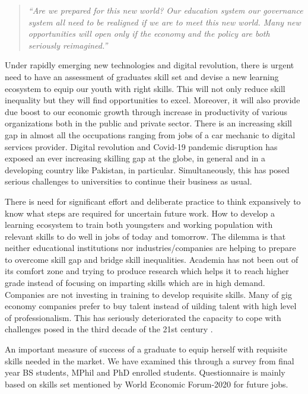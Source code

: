 \documentclass[
]{aft}
\begin{document}
\begin{quote}
\emph{``Are we prepared for this new world? Our education system our
governance system all need to be realigned if we are to meet this new
world. Many new opportunities will open only if the economy and the
policy are both seriously reimagined.''}
\end{quote}

Under rapidly emerging new technologies and digital revolution, there is
urgent need to have an assessment of graduates skill set and devise a
new learning ecosystem to equip our youth with right skills. This will
not only reduce skill inequality but they will find opportunities to
excel. Moreover, it will also provide due boost to our economic growth
through increase in productivity of various organizations both in the
public and private sector. There is an increasing skill gap in almost
all the occupations ranging from jobs of a car mechanic to digital
services provider. Digital revolution and Covid-19 pandemic disruption
has exposed an ever increasing skilling gap at the globe, in general and
in a developing country like Pakistan, in particular. Simultaneously,
this has posed serious challenges to universities to continue their
business as usual.

There is need for significant effort and deliberate practice to think
expansively to know what steps are required for uncertain future work.
How to develop a learning ecosystem to train both youngsters and working
population with relevant skills to do well in jobs of today and
tomorrow. The dilemma is that neither educational institutions nor
industries/companies are helping to prepare to overcome skill gap and
bridge skill inequalities. Academia has not been out of its comfort zone
and trying to produce research which helps it to reach higher grade
instead of focusing on imparting skills which are in high demand.
Companies are not investing in training to develop requisite skills.
Many of gig economy companies prefer to buy talent instead of uilding
talent with high level of professionalism. This has seriously
deteriorated the capacity to cope with challenges posed in the third
decade of the 21st century \citet{Weise2020}.

An important measure of success of a graduate to equip herself with
requisite skills needed in the market. We have examined this through a
survey from final year BS students, MPhil and PhD enrolled students.
Questionnaire is mainly based on skills set mentioned by World Economic
Forum-2020 for future jobs.
\end{document}
